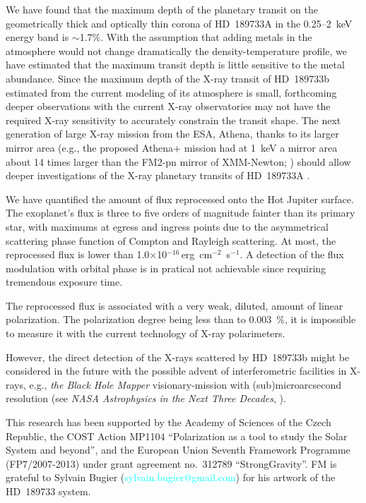 \documentclass[iop]{emulateapj}
\begin{document}
We have found that the maximum depth of the planetary transit on the geometrically thick and optically thin corona of HD~189733A
in the 0.25--2~keV energy band is $\sim$1.7\%. With the assumption that adding metals in the atmosphere would not change dramatically 
the density-temperature profile, we have estimated that the maximum transit depth is little sensitive to the metal abundance. Since 
the maximum depth of the X-ray transit of HD~189733b estimated from the current modeling of its atmosphere is small, forthcoming deeper
observations with the current X-ray observatories may not have the required X-ray sensitivity to accurately constrain the transit shape. 
The next generation of large X-ray mission from the ESA, Athena, thanks to its larger mirror area (e.g., the proposed Athena+ mission had 
at 1~keV a mirror area about 14 times larger than the FM2-pn mirror of XMM-Newton; \citealt{Nandra2013,Jansen2001}) should allow deeper 
investigations of the X-ray planetary transits of HD~189733A \citep{Branduardi2013}.

We have quantified the amount of flux reprocessed onto the Hot Jupiter surface. The exoplanet's flux is three to five orders of 
magnitude fainter than its primary star, with maximums at egress and ingress points due to the asymmetrical scattering phase function 
of Compton and Rayleigh scattering. At most, the reprocessed flux is lower than 1.0$\times$10$^{-16~}$erg~cm$^{-2}$~s$^{-1}$. 
A detection of the flux modulation with orbital phase is in pratical not achievable since requiring tremendous exposure time.

The reprocessed flux is associated with a very weak, diluted, amount of linear polarization. The polarization degree being less than 
to 0.003~\%, it is impossible to measure it with the current technology of X-ray polarimeters. 

However, the direct detection of the X-rays scattered by HD~189733b might be considered in the future with the possible advent of 
interferometric facilities in X-rays, e.g., \emph{the Black Hole Mapper} visionary-mission with (sub)microarcsecond resolution (see 
\emph{NASA Astrophysics in the Next Three Decades}, \citealt{Kouveliotou2014}).


\acknowledgements
This research has been supported by the Academy of Sciences of the Czech Republic, the COST Action MP1104 ``Polarization as a tool 
to study the Solar System and beyond'', and the European Union Seventh Framework Programme (FP7/2007-2013) under grant agreement 
no.\ 312789 ``StrongGravity''. FM is grateful to Sylvain Bugier (\textcolor{cyan}{sylvain.bugier@gmail.com}) for his artwork 
of the HD~189733 system. 



\end{document}
